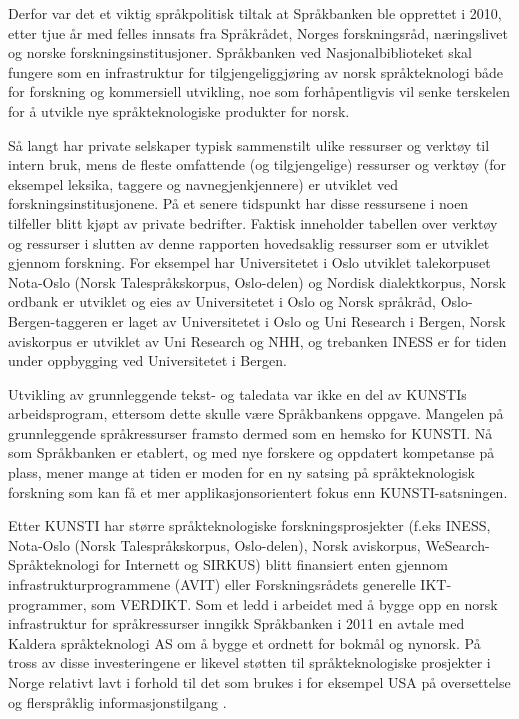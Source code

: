 \begin{multicols}{2}
Derfor var det et viktig språkpolitisk tiltak at Språkbanken ble opprettet i 2010, etter tjue år med felles innsats fra Språkrådet, Norges forskningsråd, næringslivet og norske forskningsinstitusjoner. Språkbanken ved Nasjonalbiblioteket skal fungere som en infrastruktur for tilgjengeliggjøring av norsk språkteknologi både for forskning og kommersiell utvikling, noe som forhåpentligvis vil senke terskelen for å utvikle nye språkteknologiske produkter for norsk. 

Så langt har private selskaper typisk sammenstilt ulike ressurser og verktøy til intern bruk, mens de fleste omfattende (og tilgjengelige) ressurser og verktøy (for eksempel leksika, taggere og navnegjenkjennere) er utviklet ved forskningsinstitusjonene. På et senere tidspunkt har disse ressursene i noen tilfeller blitt kjøpt av private bedrifter. Faktisk inneholder tabellen over verktøy og ressurser i slutten av denne rapporten hovedsaklig ressurser som er utviklet gjennom forskning. For eksempel har Universitetet i Oslo utviklet talekorpuset Nota-Oslo (Norsk Talespråkskorpus, Oslo-delen) og Nordisk dialektkorpus, Norsk ordbank er utviklet og eies av Universitetet i Oslo og Norsk språkråd, Oslo-Bergen-taggeren er laget av Universitetet i Oslo og Uni Research i Bergen, Norsk aviskorpus er utviklet av Uni Research og NHH, og trebanken INESS er for tiden under oppbygging ved Universitetet i Bergen.

Utvikling av grunnleggende tekst- og taledata var ikke en del av KUNSTIs arbeidsprogram, ettersom dette skulle være Språkbankens oppgave. Mangelen på grunnleggende språkressurser framsto dermed som en hemsko for KUNSTI. Nå som Språkbanken er etablert, og med nye forskere og oppdatert kompetanse på plass, mener mange at tiden er moden for en ny satsing på språkteknologisk forskning som kan få et mer applikasjonsorientert fokus enn KUNSTI-satsningen.

Etter KUNSTI har større språkteknologiske forskningsprosjekter (f.eks INESS, Nota-Oslo (Norsk Talespråkskorpus, Oslo-delen), Norsk aviskorpus, WeSearch-Språkteknologi for Internett og SIRKUS) blitt finansiert enten gjennom infrastrukturprogrammene (AVIT) eller Forskningsrådets generelle IKT-programmer, som VERDIKT. 
Som et ledd i arbeidet med å bygge opp en norsk infrastruktur for språkressurser inngikk Språkbanken i 2011 en avtale med Kaldera språkteknologi AS om å bygge et ordnett for bokmål og nynorsk. På tross av disse investeringene er likevel støtten til språkteknologiske prosjekter i Norge relativt lavt i forhold til det som brukes i for eksempel USA på oversettelse og flerspråklig informasjonstilgang \cite{laz1}.


\end{multicols}
